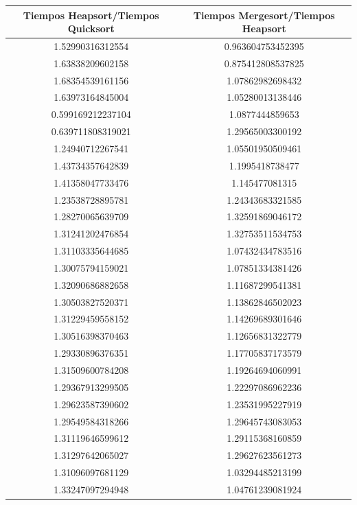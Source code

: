 \documentclass{article}
\begin{document}
		\begin{longtable}{|c||c|}
			\hline
			Tiempos Heapsort/Tiempos Quicksort & Tiempos Mergesort/Tiempos Heapsort \\ \hline
			1.52990316312554	&  0.963604753452395  \\ \hline
			1.63838209602158	&  0.875412808537825  \\ \hline
			1.68354539161156	&  1.07862982698432  \\ \hline
			1.63973164845004	&  1.05280013138446  \\ \hline
			0.599169212237104	&  1.0877444859653  \\ \hline
			0.639711808319021	&  1.29565003300192  \\ \hline
			1.24940712267541	&  1.05501950509461  \\ \hline
			1.43734357642839	&  1.1995418738477  \\ \hline
			1.41358047733476	&  1.145477081315  \\ \hline
			1.23538728895781	&  1.24343683321585  \\ \hline
			1.28270065639709	&  1.32591869046172  \\ \hline
			1.31241202476854	&  1.32753511534753  \\ \hline
			1.31103335644685	&  1.07432434783516  \\ \hline
			1.30075794159021	&  1.07851334381426  \\ \hline
			1.32090686882658	&  1.11687299541381  \\ \hline
			1.30503827520371	&  1.13862846502023  \\ \hline
			1.31229459558152	&  1.14269689301646  \\ \hline
			1.30516398370463	&  1.12656831322779  \\ \hline
			1.29330896376351	&  1.17705837173579  \\ \hline
			1.31509600784208	&  1.19264694060991  \\ \hline
			1.29367913299505	&  1.22297086962236  \\ \hline
			1.29623587390602	&  1.23531995227919  \\ \hline
			1.29549584318266	&  1.29645743083053  \\ \hline
			1.31119646599612	&  1.29115368160859  \\ \hline
			1.31297642065027	&  1.29627623561273  \\ \hline
			1.31096097681129	&  1.03294485213199  \\ \hline
			1.33247097294948	&  1.04761239081924  \\ \hline

\end{longtable}
\end{document}
